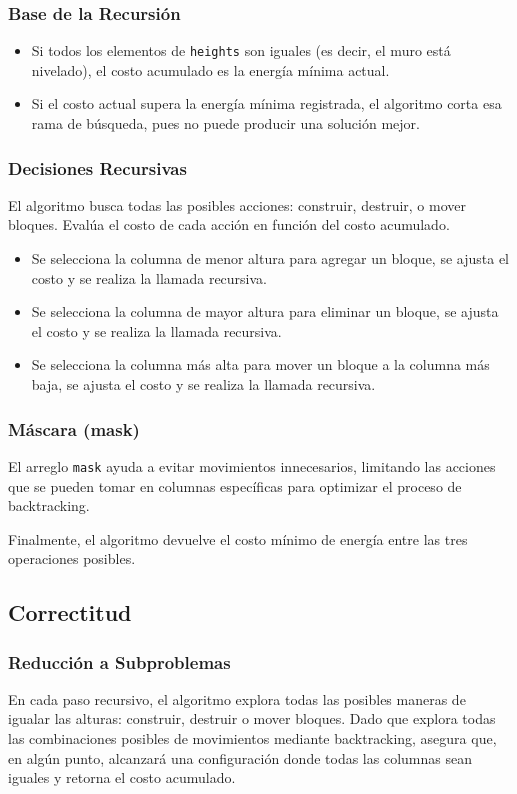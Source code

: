 \documentclass[a4paper,12pt]{article}
\begin{document}
\subsubsection{Base de la Recursión}
\begin{itemize}
	\item Si todos los elementos de \texttt{heights} son iguales (es decir, el muro está nivelado), el costo acumulado es la energía mínima actual.
	\item Si el costo actual supera la energía mínima registrada, el algoritmo corta esa rama de búsqueda, pues no puede producir una solución mejor.
\end{itemize}

\subsubsection{Decisiones Recursivas}
El algoritmo busca todas las posibles acciones: construir, destruir, o mover bloques. Evalúa el costo de cada acción en función del costo acumulado.
\begin{itemize}
	\item Se selecciona la columna de menor altura para agregar un bloque, se ajusta el costo y se realiza la llamada recursiva.
	\item Se selecciona la columna de mayor altura para eliminar un bloque, se ajusta el costo y se realiza la llamada recursiva.
	\item Se selecciona la columna más alta para mover un bloque a la columna más baja, se ajusta el costo y se realiza la llamada recursiva.
\end{itemize}

\subsubsection{Máscara (mask)}
El arreglo \texttt{mask} ayuda a evitar movimientos innecesarios, limitando las acciones que se pueden tomar en columnas específicas para optimizar el proceso de backtracking.

Finalmente, el algoritmo devuelve el costo mínimo de energía entre las tres operaciones posibles.

\subsection{Correctitud}
\subsubsection{Reducción a Subproblemas}
En cada paso recursivo, el algoritmo explora todas las posibles maneras de igualar las alturas: construir, destruir o mover bloques. Dado que explora todas las combinaciones posibles de movimientos mediante backtracking, asegura que, en algún punto, alcanzará una configuración donde todas las columnas sean iguales y retorna el costo acumulado.
\end{document}
